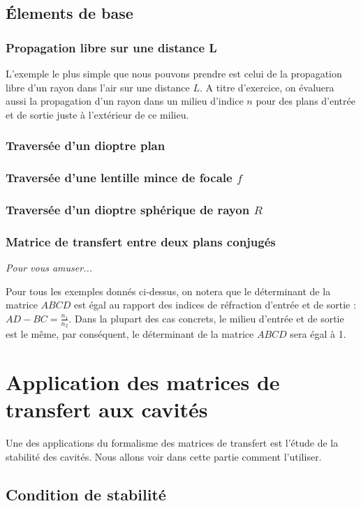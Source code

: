 \documentclass[a4paper]{article}
\begin{document}
\subsection{\'Elements de base}

\subsubsection{Propagation libre sur une distance L}
L'exemple le plus simple que nous pouvons prendre est celui de la propagation libre d'un rayon dans l'air sur une distance $L$. A titre d'exercice, on évaluera aussi la propagation d'un rayon dans un milieu d'indice $n$ pour des plans d'entrée et de sortie juste à l'extérieur de ce milieu.
\subsubsection{Traversée d'un dioptre plan}
\subsubsection{Traversée d'une lentille mince de focale $f$}
\subsubsection{Traversée d'un dioptre sphérique de rayon $R$}
\subsubsection{Matrice de transfert entre deux plans conjugés}
\textit{Pour vous amuser...}

Pour tous les exemples donnés ci-dessus, on notera que le déterminant de la matrice $ABCD$ est égal au rapport des indices de réfraction d'entrée et de sortie : $AD - BC = \frac{n_1}{n_2}$. Dans la plupart des cas concrets, le milieu d'entrée et de sortie est le même, par conséquent, le déterminant de la matrice $ABCD$ sera égal à 1.

\section{Application des matrices de transfert aux cavités}
Une des applications du formalisme des matrices de transfert est l'étude de la stabilité des cavités. Nous allons voir dans cette partie comment l'utiliser.

\subsection{Condition de stabilité}
\end{document}
